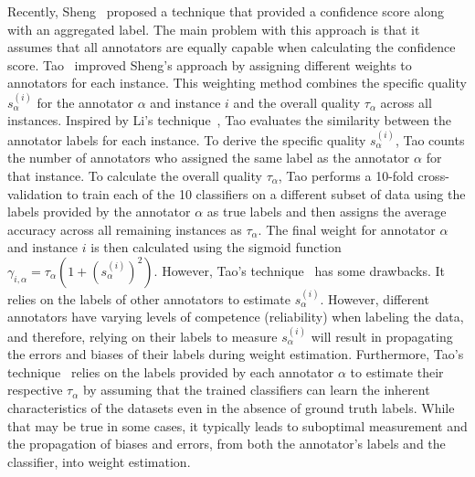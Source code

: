 \documentclass[pdflatex,bst/sn-basic]{bst/sn-jnl}%
\begin{document}
Recently, Sheng~\cite{sheng_Majority_2019} proposed a technique that provided a confidence score along with an aggregated label. The main problem with this approach is that it assumes that all annotators are equally capable when calculating the confidence score. Tao~\cite{tao_Label_2020} improved Sheng's approach by assigning different weights to annotators for each instance. This weighting method combines the specific quality $s_{\alpha}^{(i)} $ for the annotator $\alpha $ and instance $i $ and the overall quality $\tau_\alpha$ across all instances. Inspired by Li's technique~\cite{li_Incorporating_2018}, Tao evaluates the similarity between the annotator labels for each instance. To derive the specific quality $s_{\alpha}^{(i)}$, Tao counts the number of annotators who assigned the same label as the annotator $\alpha $ for that instance. To calculate the overall quality $\tau_\alpha $, Tao performs a 10-fold cross-validation to train each of the 10 classifiers on a different subset of data using the labels provided by the annotator $\alpha $ as true labels and then assigns the average accuracy across all remaining instances as $\tau_\alpha $. The final weight for annotator $\alpha $ and instance $i $ is then calculated using the sigmoid function $\gamma_{i,\alpha}=\tau_\alpha\left(1+{\left(s_{\alpha}^{(i)}\right)}^{2}\right) $. However, Tao's technique~\cite{tao_Label_2020} has some drawbacks. It relies on the labels of other annotators to estimate $s_{\alpha}^{(i)} $. However, different annotators have varying levels of competence (reliability) when labeling the data, and therefore, relying on their labels to measure $s_{\alpha}^{(i)} $ will result in propagating the errors and biases of their labels during weight estimation. Furthermore, Tao's technique~\cite{tao_Label_2020} relies on the labels provided by each annotator $\alpha $ to estimate their respective $\tau_\alpha $ by assuming that the trained classifiers can learn the inherent characteristics of the datasets even in the absence of ground truth labels. While that may be true in some cases, it typically leads to suboptimal measurement and the propagation of biases and errors, from both the annotator's labels and the classifier, into weight estimation.
\end{document}
